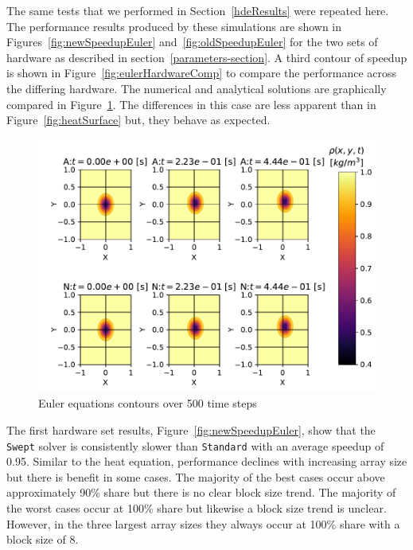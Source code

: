 \documentclass[preprints,article,accept,moreauthors,pdftex]{Definitions/mdpi}
\def\Swept{\texttt{Swept}}
\def\Standard{\texttt{Standard}}
\newcommand\fs{0.7}
\begin{document}
The same tests that we performed in Section~\ref{hdeResults} were repeated here. The performance results produced by these simulations are shown in Figures~\ref{fig:newSpeedupEuler} and~\ref{fig:oldSpeedupEuler} for the two sets of hardware as described in section~\ref{parameters-section}. A third contour of speedup is shown in Figure~\ref{fig:eulerHardwareComp} to compare the performance across the differing hardware. The numerical and analytical solutions are graphically compared in Figure~\ref{fig:eulerSurface}. The differences in this case are less apparent than in Figure~\ref{fig:heatSurface} but, they behave as expected. 


\begin{figure}[H]
    
    \begin{center}
       \includegraphics[scale=\fs, trim={0.75cm 0.4cm 0.2cm 0.2cm},clip]{figs/eulerValidate.pdf}
    \caption{Euler equations contours over 500 time steps}
    \label{fig:eulerSurface} 
    \end{center}
\end{figure}




The first hardware set results, Figure~\ref{fig:newSpeedupEuler}, show that the \Swept{} solver is consistently slower than \Standard{} with an average speedup of 0.95. Similar to the heat equation, performance declines with increasing array size but there is benefit in some cases. The majority of the best cases occur above approximately 90\% share but there is no clear block size trend. The majority of the worst cases occur at 100\% share but likewise a block size trend is unclear. However, in the three largest array sizes they always occur at 100\% share with a block size of 8.
\end{document}
